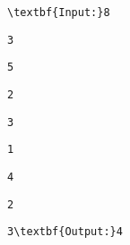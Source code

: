 \begin{verbatim}
\textbf{Input:}8 \end{verbatim}
\begin{verbatim}
3 \end{verbatim}
\begin{verbatim}
5 \end{verbatim}
\begin{verbatim}
2 \end{verbatim}
\begin{verbatim}
3 \end{verbatim}
\begin{verbatim}
1 \end{verbatim}
\begin{verbatim}
4 \end{verbatim}
\begin{verbatim}
2 \end{verbatim}
\begin{verbatim}
3\textbf{Output:}4\end{verbatim}